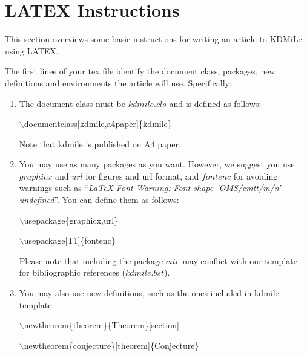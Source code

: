 \documentclass[kdmile,a4paper]{kdmile} %
\newenvironment{latexcode}
{\ttfamily\vspace{0.1in}\setlength{\parindent}{18pt}}
{\vspace{0.1in}}
\begin{document}

\section{LATEX Instructions}

This section overviews some basic instructions for writing an article to KDMiLe using LATEX.


The first lines of your tex file identify the document class, packages, new definitions and environments the article will use.
Specifically:

\begin{enumerate}
	\item The document class must be $kdmile.cls$ and is defined as follows:
	
				\begin{latexcode} 
		          $\backslash$documentclass[kdmile,a4paper]\{kdmile\}
		    \end{latexcode}
				
		\rmfamily Note that kdmile is published on A4 paper.

  \item You may use as many packages as you want. However, we suggest you use $graphicx$ and $url$ for figures and url format, and $fontenc$ for avoiding warnings such as ``\textit{LaTeX Font Warning: Font shape 'OMS/cmtt/m/n' undefined}''. You can define them as follows:
    
    	\begin{latexcode} 
				$\backslash$usepackage\{graphicx,url\} 
		
				$\backslash$usepackage[T1]\{fontenc\}\vspace{0.1in}
			\end{latexcode}
		
		Please note that including the package $cite$ may conflict with our template for bibliographic references ($kdmile.bst$).
	
	\item You may also use new definitions, such as the ones included in kdmile template:
	
	
			\begin{latexcode} 
		  $\backslash$newtheorem\{theorem\}\{Theorem\}[section] 
		  
			$\backslash$newtheorem\{conjecture\}[theorem]\{Conjecture\}
			

\end{latexcode}
\end{enumerate}
\end{document}
